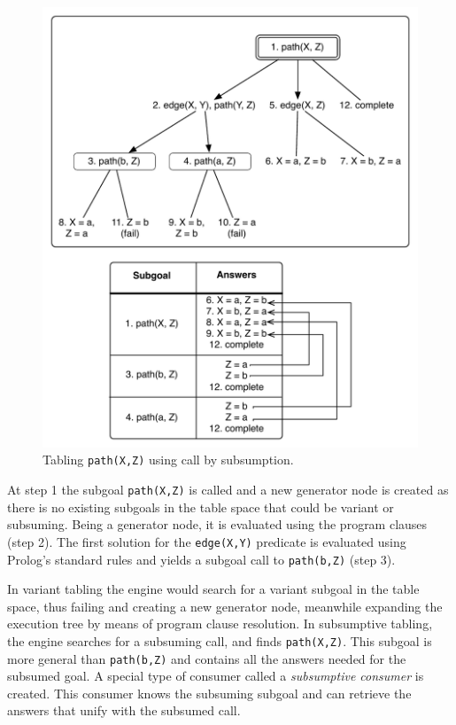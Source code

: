 \begin{figure}[ht]
\centering
  \includegraphics[scale=0.6]{tabling_path_sub.pdf}
\caption{Tabling \texttt{path(X,Z)} using call by subsumption.}
\label{fig:tabling_path_sub}
\end{figure}

At step 1 the subgoal \texttt{path(X,Z)} is called and a new generator node is created as there is no existing subgoals in the table space
that could be variant or subsuming. Being a generator node, it is evaluated using the program clauses (step 2). The first solution
for the \texttt{edge(X,Y)} predicate is evaluated using Prolog's standard rules and yields a subgoal call to \texttt{path(b,Z)} (step 3).

In variant tabling the engine would search for a variant subgoal in the table space, thus failing and creating a new generator node,
meanwhile expanding the execution tree by means of program clause resolution. In subsumptive tabling, the engine searches for a subsuming call,
and finds \texttt{path(X,Z)}. This subgoal
is more general than \texttt{path(b,Z)} and contains all the answers needed for the subsumed goal.
A special type of consumer called a \textit{subsumptive consumer} is created. This consumer knows the subsuming subgoal and can retrieve
the answers that unify with the subsumed call.

